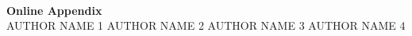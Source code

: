 \clearpage
\begin{center}
\medskip \\
	\Large \textbf{Online Appendix} \bigskip \\
\large AUTHOR NAME 1 \hspace{0.3cm} AUTHOR NAME 2 \hspace{0.3cm} AUTHOR NAME 3 \hspace{0.3cm} AUTHOR NAME 4 \bigskip
	
\end{center}


%

%

%





